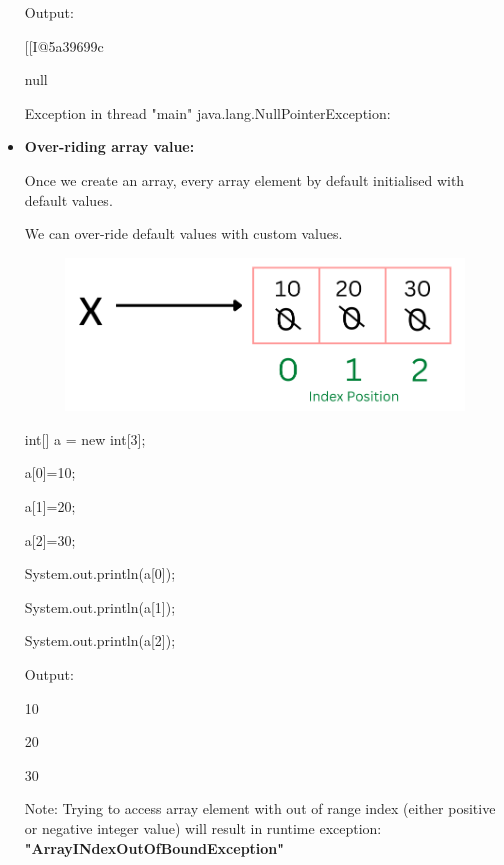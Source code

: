 \begin{flushleft}
\begin{itemize}
		Output:
		\begin{tcolorbox}[breakable,notitle,boxrule=-0pt,colback=output,colframe=output]
			\color{black}
			\font=8pt
			[[I@5a39699c \par
			null  \par
			Exception in thread "main" java.lang.NullPointerException: 
			\font=4pt
		\end{tcolorbox}	
		
		\bigskip
		
		\item \textbf{Over-riding array value:} \par
		Once we create an array, every array element by default initialised with default values. \par
		We can over-ride default values with custom values.
		
		\begin{figure}[h!]
			\centering
			\includegraphics[scale=.45]{content/chapter4/images/image2.png}
		\end{figure}	
		
		\begin{tcolorbox}[breakable,notitle,boxrule=1pt,colback=code,colframe=code]
			\color{black}
			\font=8pt
			int[] a = new int[3]; \par
			a[0]=10; \par
			a[1]=20; \par
			a[2]=30; \par
			System.out.println(a[0]); \par
			System.out.println(a[1]); \par
			System.out.println(a[2]);
			\font=4pt
		\end{tcolorbox}
		
		Output:
		\begin{tcolorbox}[breakable,notitle,boxrule=-0pt,colback=output,colframe=output]
			\color{black}
			\font=8pt
			10 \par
			20 \par
			30 
			\font=4pt
		\end{tcolorbox}	
		
		Note: Trying to access array element with out of range index (either positive or negative integer value) will result in runtime exception:  \textbf{"ArrayINdexOutOfBoundException"}
		
	\end{itemize}
	
	
\end{flushleft}
\newpage

